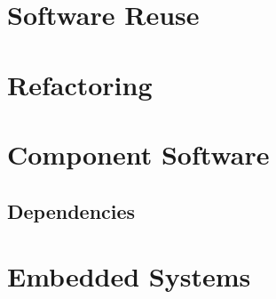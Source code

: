 \section{Software Reuse}

\section{Refactoring}

\section{Component Software}
\subsection{Dependencies}

\section{Embedded Systems}